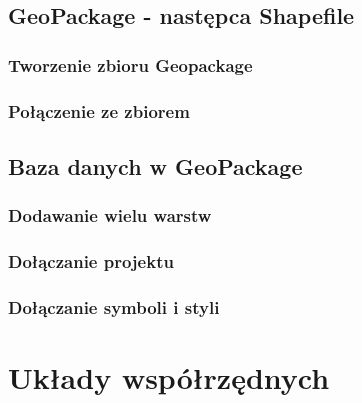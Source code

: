\documentclass[a4paper,11pt, onecolumn, openany]{memoir}
\begin{document}
		\section{GeoPackage - następca Shapefile}
			\subsection{Tworzenie zbioru Geopackage}
			\subsection{Połączenie ze zbiorem}
		\section{Baza danych w GeoPackage}
			\subsection{Dodawanie wielu warstw}
			\subsection{Dołączanie projektu}
			\subsection{Dołączanie symboli i styli}

	\chapter{Układy współrzędnych}
\end{document}

